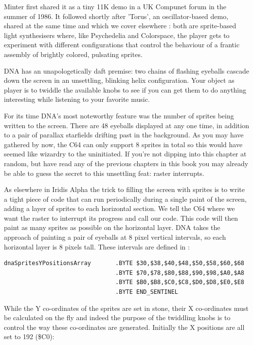 Minter first shared it as a tiny 11K demo in a UK Compunet forum in the summer of 
1986. It followed shortly after 'Torus', an oscillator-based demo, shared at the same time and which we
cover elsewhere : both are sprite-based
light synthesisers where, like Psychedelia and Colorspace, the player gets to experiment with different
configurations that control the behaviour of a frantic assembly of brightly colored, pulsating sprites.

DNA has an unapologetically daft premise: two chains of flashing eyeballs cascade down the
screen in an unsettling, blinking helix configuration. Your object as player is to twiddle the available
knobs to see if you can get them to do anything interesting while listening to your favorite music.

For its time DNA's most noteworthy feature was the number of sprites being written to the screen. There are
48 eyeballs displayed at any one time, in addition to a pair of parallax starfields drifting past in the
background. As you may have gathered by now, the C64 can only support 8 sprites in total so this would
have seemed like wizardry to the uninitiated. If you're not dipping into this chapter at random, but have
read any of the previous chapters in this book you may already be able to guess the secret to this 
unsettling feat: raster interrupts.

As elsewhere in Iridis Alpha the trick to filling the screen with sprites is to write a tight piece of code
that can run periodically during a single paint of the screen, adding a layer of sprites to each horizontal
section. We tell the C64 where we want the raster to interrupt its progress and call our code. This code
will then paint as many sprites as possible on the horizontal layer. DNA takes the approach of painting a
pair of eyeballs at 8 pixel vertical intervals, so each horizontal layer is 8 pixels tall. 
These intervals are defined in :

\begin{lstlisting}
dnaSpritesYPositionsArray       .BYTE $30,$38,$40,$48,$50,$58,$60,$68
                                .BYTE $70,$78,$80,$88,$90,$98,$A0,$A8
                                .BYTE $B0,$B8,$C0,$C8,$D0,$D8,$E0,$E8
                                .BYTE END_SENTINEL
\end{lstlisting}

While the Y co-ordinates of the sprites are set in stone, their X co-ordinates must be calculated on the fly
and indeed the purpose of the twiddling knobs is to control the way these co-ordinates are generated. Initially
the X positions are all set to 192 (\$C0):

